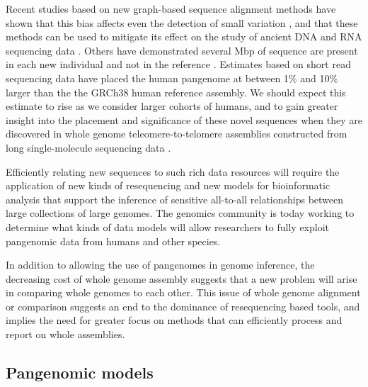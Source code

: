 Recent studies based on new graph-based sequence alignment methods have shown that this bias affects even the detection of small variation \cite{eggertsson2017graphtyper,Garrison_2018}, and that these methods can be used to mitigate its effect on the study of ancient DNA \cite{martiniano2019removing} and RNA sequencing data \cite{Kim_2019}.
Others have demonstrated several Mbp of sequence are present in each new individual and not in the reference \cite{li2010building,Steinberg_2016,Audano_2019}.
Estimates based on short read sequencing data have placed the human pangenome at between 1\% \cite{li2010building} and 10\% \cite{sherman2019assembly} larger than the the GRCh38 human reference assembly.
We should expect this estimate to rise as we consider larger cohorts of humans, and to gain greater insight into the placement and significance of these novel sequences when they are discovered in whole genome teleomere-to-telomere assemblies constructed from long single-molecule sequencing data \cite{miga2019telomere,Langley_2019}.

Efficiently relating new sequences to such rich data resources will require the application of new kinds of resequencing and new models for bioinformatic analysis that support the inference of sensitive all-to-all relationships between large collections of large genomes.
The genomics community is today working to determine what kinds of data models will allow researchers to fully exploit pangenomic data from humans and other species.

In addition to allowing the use of pangenomes in genome inference, the decreasing cost of whole genome assembly suggests that a new problem will arise in comparing whole genomes to each other.
This issue of whole genome alignment or comparison suggests an end to the dominance of resequencing based tools, and implies the need for greater focus on methods that can efficiently process and report on whole assemblies.


\subsection{Pangenomic models}

